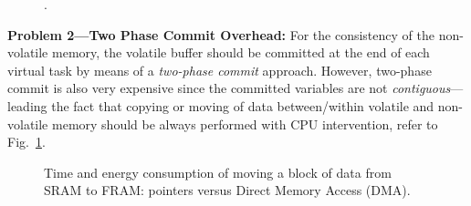 \begin{figure}[t]
	\centering
	\caption{.}
	\label{fig:sram_vs_dma}
\end{figure}

\textbf{Problem 2---Two Phase Commit Overhead:} For the consistency of the non-volatile memory, the volatile buffer should be committed at the end of each virtual task by means of a \emph{two-phase commit} approach. However, two-phase commit is also very expensive since the committed variables are not \emph{contiguous}---leading the fact that copying or moving of data between/within volatile and non-volatile memory should be always performed with CPU intervention, refer to Fig.~\ref{fig:sram_vs_dma}.

\begin{figure}[t]
	\centering
	\caption{Time and energy consumption of moving a block of data from SRAM to FRAM: pointers versus Direct Memory Access (DMA).}
	\label{fig:dmaTimeEnergy}
\end{figure}

